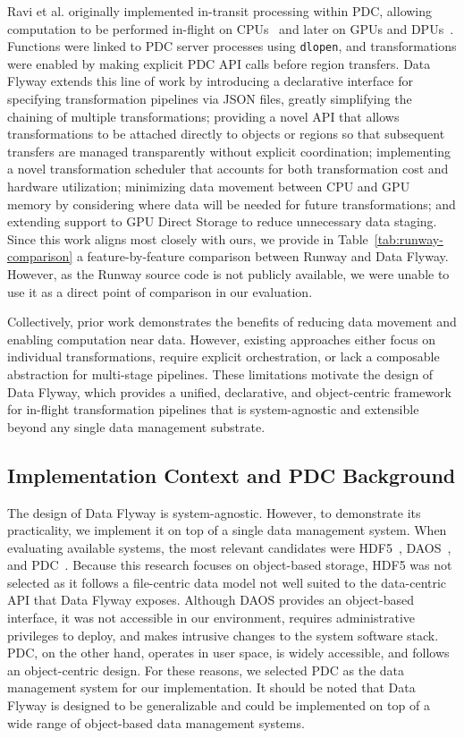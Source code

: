 Ravi et al. originally implemented in-transit processing within PDC, allowing computation to be performed in-flight on CPUs~\cite{warren2019analysis} and later on GPUs and DPUs~\cite{ravi2023runway}. Functions were linked to PDC server processes using \texttt{dlopen}, and transformations were enabled by making explicit PDC API calls before region transfers. Data Flyway extends this line of work by introducing a declarative interface for specifying transformation pipelines via JSON files, greatly simplifying the chaining of multiple transformations; providing a novel API that allows transformations to be attached directly to objects or regions so that subsequent transfers are managed transparently without explicit coordination; implementing a novel transformation scheduler that accounts for both transformation cost and hardware utilization; minimizing data movement between CPU and GPU memory by considering where data will be needed for future transformations; and extending support to GPU Direct Storage to reduce unnecessary data staging. Since this work aligns most closely with ours, we provide in Table~\ref{tab:runway-comparison} a feature-by-feature comparison between Runway and Data Flyway. However, as the Runway source code is not publicly available, we were unable to use it as a direct point of comparison in our evaluation.

Collectively, prior work demonstrates the benefits of reducing data movement and enabling computation near data. However, existing approaches either focus on individual transformations, require explicit orchestration, or lack a composable abstraction for multi-stage pipelines. These limitations motivate the design of Data Flyway, which provides a unified, declarative, and object-centric framework for in-flight transformation pipelines that is system-agnostic and extensible beyond any single data management substrate.

\subsection{Implementation Context and PDC Background}

The design of Data Flyway is system-agnostic. However, to demonstrate its practicality, we implement it on top of a single data management system. When evaluating available systems, the most relevant candidates were HDF5~\cite{hdf5}, DAOS~\cite{breitenfeld2017daos}, and PDC~\cite{pdc}. Because this research focuses on object-based storage, HDF5 was not selected as it follows a file-centric data model not well suited to the data-centric API that Data Flyway exposes. Although DAOS provides an object-based interface, it was not accessible in our environment, requires administrative privileges to deploy, and makes intrusive changes to the system software stack. PDC, on the other hand, operates in user space, is widely accessible, and follows an object-centric design. For these reasons, we selected PDC as the data management system for our implementation. It should be noted that Data Flyway is designed to be generalizable and could be implemented on top of a wide range of object-based data management systems.

